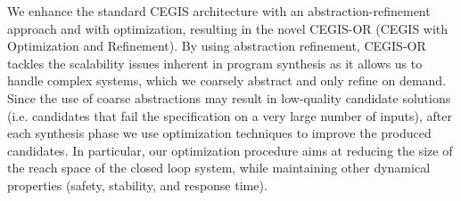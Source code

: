 \documentclass[sigconf]{llncs}
\begin{document}
%
We enhance the standard CEGIS architecture with an
abstraction-refinement approach and with optimization, resulting in
the novel CEGIS-OR (CEGIS with Optimization and Refinement).  By using
abstraction refinement, CEGIS-OR tackles the scalability issues
inherent in program synthesis as it allows us to handle complex
systems, which we coarsely abstract and only refine on demand.
Since the use of coarse abstractions may result in
low-quality candidate solutions (i.e. candidates that fail the
specification on a very large number of inputs), after each synthesis
phase we use optimization techniques to improve the produced
candidates.  In particular, our optimization procedure aims at
reducing the size of the reach space of the closed loop system, while
maintaining other dynamical properties (safety, stability, and
response time).

\end{document}
